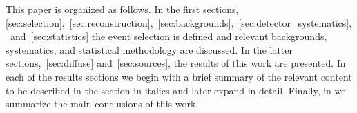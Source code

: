 This paper is organized as follows.
In the first sections, \ref{sec:selection},~\ref{sec:reconstruction},~\ref{sec:backgrounds},~\ref{sec:detector_systematics},~and~\ref{sec:statistics} the event selection is defined and relevant backgrounds, systematics, and statistical methodology are discussed.
In the latter sections,~\ref{sec:diffuse} and~\ref{sec:sources}, the results of this work are presented.
In each of the results sections we begin with a brief summary of the relevant content to be described in the section in italics and later expand in detail. 
Finally, in  we summarize the main conclusions of this work.


